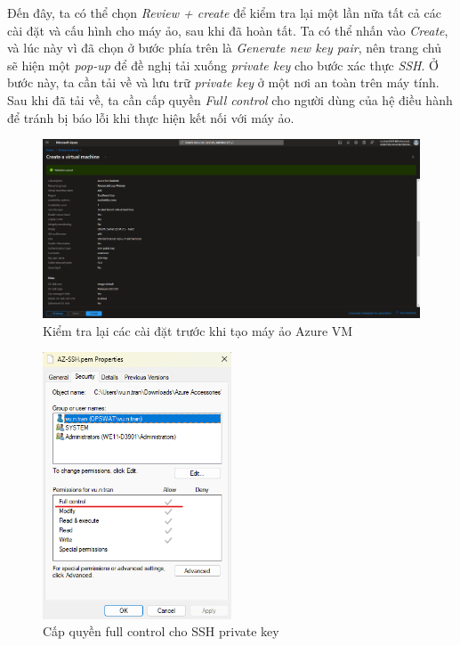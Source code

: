 \hspace*{1cm}
Đến đây, ta có thể chọn \textit{Review + create} để kiểm tra lại một lần nữa tất cả các cài đặt và cấu hình cho máy ảo, sau khi đã hoàn tất. Ta có thể nhấn vào \textit{Create}, và lúc này vì đã chọn ở bước phía trên là \textit{Generate new key pair}, nên trang chủ sẽ hiện một \textit{pop-up} để đề nghị tải xuống \textit{private key} cho bước xác thực \textit{SSH}. Ở bước này, ta cần tải về và lưu trữ \textit{private key} ở một nơi an toàn trên máy tính. Sau khi đã tải về, ta cần cấp quyền \textit{Full control} cho người dùng của hệ điều hành để tránh bị báo lỗi khi thực hiện kết nối với máy ảo.
\begin{figure}[H]
    \centering
    \includegraphics[width=1\textwidth]{Images/Deployment/HybridSearch/ReviewCreate.png}
    \caption{Kiểm tra lại các cài đặt trước khi tạo máy ảo Azure VM}
\end{figure}
\begin{figure}[H]
    \centering
    \includegraphics[width=0.5\textwidth]{Images/Deployment/HybridSearch/FullControl.png}
    \caption{Cấp quyền full control cho SSH private key}
\end{figure}
